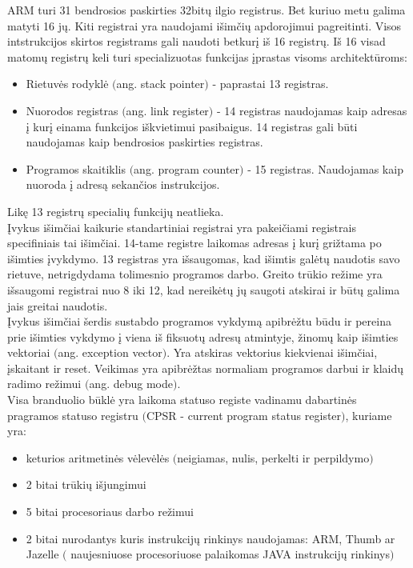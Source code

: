 \documentclass[a4paper, 12pt]{article} %
\begin{document}
\begin{onehalfspacing}
\indent ARM turi 31 bendrosios paskirties 32bit\k{u} ilgio registrus. Bet kuriuo metu galima matyti 16 j\k{u}. Kiti registrai yra naudojami i\v{s}im\v{c}i\k{u} apdorojimui pagreitinti. Visos intstrukcijos skirtos registrams gali naudoti betkur\k{i} i\v{s} 16 registr\k{u}. I\v{s} 16 visad matom\k{u} registr\k{u} keli turi specializuotas funkcijas \k{i}prastas visoms architekt\={u}roms:
\begin{itemize}
\item Rietuv\.{e}s rodykl\.{e} $($ang. stack pointer$)$ - paprastai 13 registras.
\item Nuorodos registras $($ang. link register$)$ - 14 registras naudojamas kaip adresas \k{i} kur\k{i} einama funkcijos i\v{s}kvietimui pasibaigus. 14 registras gali b\={u}ti naudojamas kaip bendrosios paskirties registras.
\item Programos skaitiklis $($ang. program counter$)$ - 15 registras. Naudojamas kaip nuoroda \k{i} adres\k{a} sekan\v{c}ios instrukcijos. 
\end{itemize}
Lik\k{e} 13 registr\k{u} speciali\k{u} funkcij\k{u} neatlieka. \\
\indent 
\k{I}vykus i\v{s}im\v{c}iai kaikurie standartiniai registrai yra pakei\v{c}iami registrais specifiniais tai i\v{s}im\v{c}iai. 14-tame registre laikomas adresas \k{i} kur\k{i} gri\v{z}tama po i\v{s}imties \k{i}vykdymo. 13 registras yra i\v{s}saugomas, kad i\v{s}imtis gal\.{e}t\k{u} naudotis savo rietuve, netrigdydama tolimesnio programos darbo. Greito tr\={u}kio re\v{z}ime yra i\v{s}saugomi registrai nuo 8 iki 12, kad nereik\.{e}t\k{u} j\k{u} saugoti atskirai ir b\={u}t\k{u} galima jais greitai naudotis. \\
\indent \k{I}vykus i\v{s}im\v{c}iai \v{s}erdis sustabdo programos vykdym\k{a} apibr\.{e}\v{z}tu b\={u}du ir pereina prie i\v{s}imties vykdymo \k{i} viena i\v{s} fiksuot\k{u} adres\k{u} atmintyje, \v{z}inom\k{u} kaip i\v{s}imties vektoriai $($ang. exception vector$)$. Yra atskiras vektorius kiekvienai i\v{s}im\v{c}iai, \k{i}skaitant ir reset. Veikimas yra apibr\.{e}\v{z}tas normaliam programos darbui ir klaid\k{u} radimo re\v{z}imui $($ang. debug mode$)$.  \\
\indent Visa branduolio b\={u}kl\.{e} yra laikoma statuso registe vadinamu dabartin\.{e}s pragramos statuso registru $($CPSR - current program status register$)$, kuriame yra:
\begin{itemize}
\item keturios aritmetin\.{e}s v\.{e}lev\.{e}l\.{e}s $($neigiamas, nulis, perkelti ir perpildymo$)$
\item 2 bitai tr\={u}ki\k{u} i\v{s}jungimui
\item 5 bitai procesoriaus darbo re\v{z}imui
\item 2 bitai nurodantys kuris instrukcij\k{u} rinkinys naudojamas: ARM, Thumb ar Jazelle  $($ naujesniuose procesoriuose palaikomas JAVA instrukcij\k{u} rinkinys$)$
\end{itemize}

\end{onehalfspacing}
\end{document}
